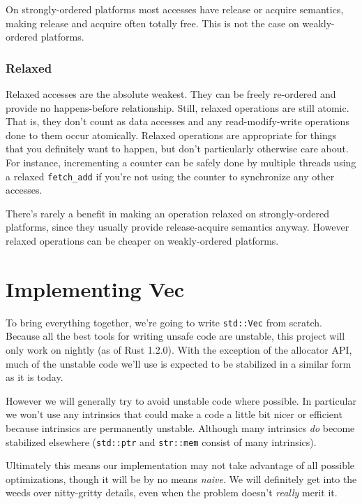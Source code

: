 \documentclass[a4paper,]{book}
\begin{document}
On strongly-ordered platforms most accesses have release or acquire
semantics, making release and acquire often totally free. This is not
the case on weakly-ordered platforms.

\subsection{Relaxed}\label{relaxed}

Relaxed accesses are the absolute weakest. They can be freely re-ordered
and provide no happens-before relationship. Still, relaxed operations
are still atomic. That is, they don't count as data accesses and any
read-modify-write operations done to them occur atomically. Relaxed
operations are appropriate for things that you definitely want to
happen, but don't particularly otherwise care about. For instance,
incrementing a counter can be safely done by multiple threads using a
relaxed \texttt{fetch\_add} if you're not using the counter to
synchronize any other accesses.

There's rarely a benefit in making an operation relaxed on
strongly-ordered platforms, since they usually provide release-acquire
semantics anyway. However relaxed operations can be cheaper on
weakly-ordered platforms.

\chapter{Implementing Vec}\label{sec--vec}

To bring everything together, we're going to write \texttt{std::Vec}
from scratch. Because all the best tools for writing unsafe code are
unstable, this project will only work on nightly (as of Rust 1.2.0).
With the exception of the allocator API, much of the unstable code we'll
use is expected to be stabilized in a similar form as it is today.

However we will generally try to avoid unstable code where possible. In
particular we won't use any intrinsics that could make a code a little
bit nicer or efficient because intrinsics are permanently unstable.
Although many intrinsics \emph{do} become stabilized elsewhere
(\texttt{std::ptr} and \texttt{str::mem} consist of many intrinsics).

Ultimately this means our implementation may not take advantage of all
possible optimizations, though it will be by no means \emph{naive}. We
will definitely get into the weeds over nitty-gritty details, even when
the problem doesn't \emph{really} merit it.
\end{document}
